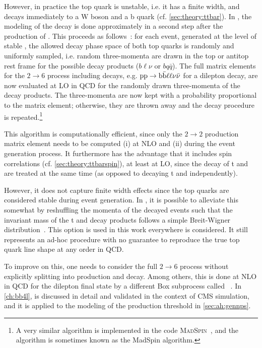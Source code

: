 However, in practice the top quark is unstable, i.e. it has a finite width, and decays immediately to a W boson and a b quark (cf. \cref{sec:theory:ttbar}). In \hvq, the modeling of the decay is done approximately in a second step after the production of \ttbar. This proceeds as follows~\cite{Frixione:2007zp,Artoisenet:2012st}: 
for each event, generated at the level of stable \ttbar, the allowed decay phase space of both top quarks is randomly and uniformly sampled, i.e. random three-momenta are drawn in the top or antitop rest frame for the possible decay products ($b \ell \nu$ or $b q \bar{q}$). The full matrix elements for the $2 \rightarrow 6$ process including decays, e.g. $\mathrm{pp} \rightarrow \mathrm{b \bar{b}} \ell \ell \nu \bar{\nu}$ for a dilepton decay, are now evaluated at LO in QCD for the randomly drawn three-momenta of the decay products. The three-momenta are now kept with a probability proportional to the matrix element; otherwise, they are thrown away and the decay procedure is repeated.\footnote{A very similar algorithm is implemented in the code \textsc{MadSpin}~\cite{Artoisenet:2012st}, and the algorithm is sometimes known as the MadSpin algorithm.}

This algorithm is computationally efficient, since only the $2 \rightarrow 2$ production matrix element needs to be computed (i) at NLO and (ii) during the event generation process. It furthermore has the advantage that it includes \ttbar spin correlations (cf. \cref{sec:theory:ttbarspin}), at least at LO, since the decay of t and \tbar are treated at the same time (as opposed to decaying t and \tbar independently). 

However, it does not capture finite width effects since the top quarks are considered stable during event generation. In \hvq, it is possible to alleviate this somewhat by reshuffling the momenta of the decayed \ttbar events such that the invariant mass of the t and \tbar decay products follows a simple Breit-Wigner distribution~\cite{Artoisenet:2012st}. This option is used in this work everywhere \hvq is considered. It still represents an ad-hoc procedure with no guarantee to reproduce the true top quark line shape at any order in QCD. 

To improve on this, one needs to consider the full $2 \rightarrow 6$ process without explicitly splitting into production and decay. Among others, this is done at NLO in QCD for the dilepton final state by a different \powheg Box subprocess called \bbfourl ~\cite{Jezo:2016ujg}. In \cref{ch:bb4l}, \bbfourl is discussed in detail and validated in the context of CMS simulation, and it is applied to the modeling of the \ttbar production threshold in \cref{sec:ah:gennps}.

